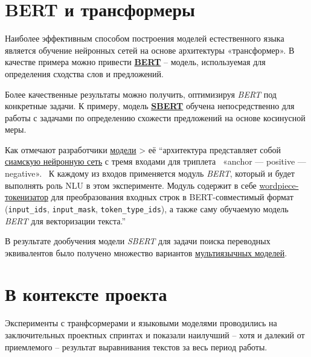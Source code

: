 \documentclass[
  letterpaper,
]{book}
\begin{document}
\hypertarget{sec-about_bert}{%
\section{BERT и трансформеры}\label{sec-about_bert}}

Наиболее эффективным способом построения моделей естественного языка
является обучение нейронных сетей на основе архитектуры «трансформер». В
качестве примера можно привести
\href{https://arxiv.org/abs/1810.04805}{\textbf{BERT}} -- модель,
используемая для определения сходства слов и предложений.

Более качественные результаты можно получить, оптимизируя \emph{BERT}
под конкретные задачи. К примеру, модель
\href{https://arxiv.org/pdf/1908.10084.pdf}{\textbf{SBERT}} обучена
непосредственно для работы с задачами по определению схожести
предложений на основе косинусной меры.

Как отмечают разработчики
\href{https://habr.com/ru/companies/sberdevices/articles/527576/}{модели}
\textgreater{} её ``архитектура представляет собой
\href{https://en.wikipedia.org/wiki/Siamese_neural_network}{сиамскую
нейронную сеть} с тремя входами для триплета~ «anchor --- positive ---
negative».~ К каждому из входов применяется модуль \emph{BERT}, который
и будет выполнять роль NLU в этом эксперименте. Модуль содержит в себе
\href{https://paperswithcode.com/method/wordpiece}{wordpiece-токенизатор}
для преобразования входных строк в BERT-совместимый формат
(\texttt{input\_ids}, \texttt{input\_mask}, \texttt{token\_type\_ids}),
а также саму обучаемую модель \emph{BERT} для векторизации текста.''

В результате дообучения модели \emph{SBERT} для задачи поиска переводных
эквивалентов было получено множество вариантов
\href{https://huggingface.co/models?pipeline_tag=sentence-similarity\&sort=downloads\&search=multi}{мультиязычных
моделей}.

\hypertarget{sec-project_transformers}{%
\section{В контексте проекта}\label{sec-project_transformers}}

Эксперименты с транфсормерами и языковыми моделями проводились на
заключительных проектных спринтах и показали наилучший -- хотя и далекий
от приемлемого -- результат выравнивания текстов за весь период работы.
\end{document}
